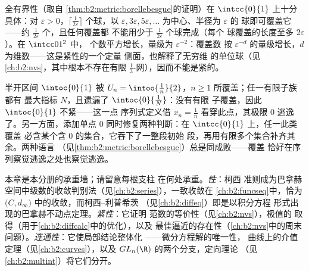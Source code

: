 \begin{example}\label{ex:b2:metric:epsnet}
全有界性（取自
\cref{thm:b2:metric:borellebesgue}的证明）在
$\intcc{0}{1}$ 上十分具体：对 $\varepsilon > 0$，$\lceil
\frac{1}{2\varepsilon}\rceil$ 个球，以 $\varepsilon,
3\varepsilon, 5\varepsilon, \dots$ 为中心、半径为 $\varepsilon$ 的
球即可覆盖它——约 $\frac1{2\varepsilon}$ 个，且任何覆盖都
不能用少于 $\frac{1}{2\varepsilon}$ 个球完成（每个
球覆盖的长度至多 $2\varepsilon$）。在 $\intcc01^2$ 中，
个数平方增长，量级为 $\varepsilon^{-2}$：覆盖数
按 $\varepsilon^{-d}$ 的量级增长，$d$ 为维数——这是紧性的一个定量
侧面，也解释了无穷维
的单位球（见\cref{ch:b2:nvs}，其中根本不存在有限
$\frac13$-网），因而不能是紧的。
\end{example}

\begin{example}[从覆盖读出紧性]\label{ex:b2:metric:covers}
半开区间 $\intoc{0}{1}$ 被
$U_n = \intoo{\frac1n}{2}$，$n \geq 1$ 所覆盖；任一有限子族都有
最大指标 $N$，且遗漏了 $\intoc{0}{\frac1N}$：没有有限
子覆盖，因此 $\intoc{0}{1}$ 不紧——这一点
序列式定义借 $x_n = \frac1n$ 看穿此点，其极限
$0$ 逃逸了。另一方面，添加单点 $0$
同时修复两种判断：在 $\intcc{0}{1}$ 上，任一此类覆盖
必含某个含 $0$ 的集合，它吞下了一整段初始
段，再用有限多个集合补齐其余。两种语言
（见\cref{thm:b2:metric:borellebesgue}）总是同成败——覆盖
恰好在序列察觉逃逸之处也察觉逃逸。
\end{example}

\begin{remark}[本分册内的几个视角]\label{rem:b2:metric:perspectives}
本章是本分册的承重墙；请留意每根支柱
在何处承重。\emph{性}：柯西
准则成为巴拿赫
空间中级数的收敛判别法（见\cref{ch:b2:series}），一致收敛在
\cref{ch:b2:funcseq}中，恰为
 $\bigl(C, d_\infty\bigr)$ 中的收敛，而柯西--利普希茨
（见\cref{ch:b2:diffeq}）即是以积分方程
形式出现的巴拿赫不动点定理。\emph{紧性}：它证明
范数的等价性（见\cref{ch:b2:nvs}），极值的
取得（用于\cref{ch:b2:diffcalc}中的优化），以及
最佳逼近的存在性（\cref{ch:b2:nvs}中的周末
问题）。\emph{连通性}：它使局部结论整体化
——微分方程解的唯一性，
曲线上的介值定理（见\cref{ch:b2:curves}），以及
$GL_n(\R)$ 的两个分支，定向理论
（见\cref{ch:b2:multint}）将它们分开。
\end{remark}

